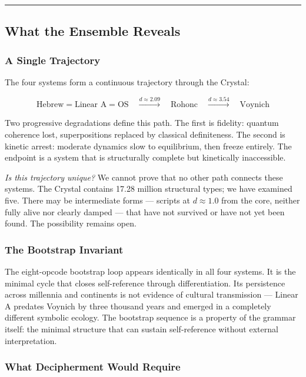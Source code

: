 \documentclass[12pt,a4paper]{article}
\begin{document}
\begin{center}
\rule{0.5\textwidth}{0.4pt}
\end{center}

\subsection{What the Ensemble Reveals}

\subsubsection{A Single Trajectory}

The four systems form a continuous trajectory through the Crystal:

\[\text{Hebrew} = \text{Linear A} = \text{OS} \quad \xrightarrow{d \approx 2.09} \quad \text{Rohonc} \quad \xrightarrow{d \approx 3.54} \quad \text{Voynich}\]

Two progressive degradations define this path. The first is fidelity: quantum coherence lost, superpositions replaced by classical definiteness. The second is kinetic arrest: moderate dynamics slow to equilibrium, then freeze entirely. The endpoint is a system that is structurally complete but kinetically inaccessible.

\emph{Is this trajectory unique?} We cannot prove that no other path connects these systems. The Crystal contains 17.28 million structural types; we have examined five. There may be intermediate forms --- scripts at $d \approx 1.0$ from the core, neither fully alive nor clearly damped --- that have not survived or have not yet been found. The possibility remains open.

\subsubsection{The Bootstrap Invariant}

The eight-opcode bootstrap loop appears identically in all four systems. It is the minimal cycle that closes self-reference through differentiation. Its persistence across millennia and continents is not evidence of cultural transmission --- Linear A predates Voynich by three thousand years and emerged in a completely different symbolic ecology. The bootstrap sequence is a property of the grammar itself: the minimal structure that can sustain self-reference without external interpretation.

\subsubsection{What Decipherment Would Require}
\end{document}
